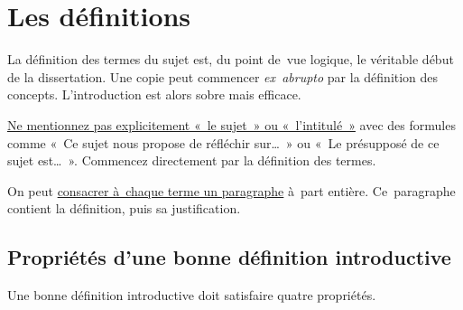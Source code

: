 \documentclass[a4paper,12pt]{report}
\begin{document}
\section{Les définitions}
\label{sec:org6646418}
\label{org4c9ee07}

La définition des termes du sujet est, du point de vue logique, le
véritable début de la dissertation. Une copie peut commencer
\emph{ex abrupto} par la définition des concepts. L'introduction est alors
sobre mais efficace.

\uline{Ne mentionnez pas explicitement « le sujet » ou « l'intitulé »} avec
des formules comme « Ce sujet nous propose de réfléchir sur\ldots{} » ou « Le
présupposé de ce sujet est\ldots{} ». Commencez directement par la définition
des termes.

On peut \uline{consacrer à chaque terme un paragraphe} à part entière.
Ce paragraphe contient la définition, puis sa justification.


\subsection{Propriétés d'une bonne définition introductive}
\label{sec:org44cf05b}

Une bonne définition introductive doit satisfaire quatre propriétés.
\end{document}
